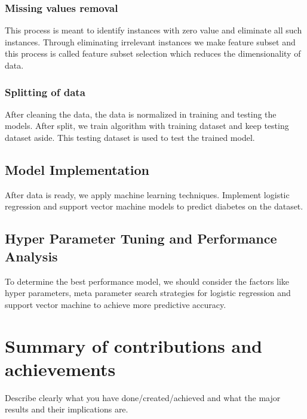 \subsubsection{Missing values removal}
\label{sec:intro_some_subsub1}
This process is meant to identify instances with zero value and eliminate all such instances. Through eliminating irrelevant instances we make feature subset and this process is called feature subset selection which reduces the dimensionality of data.

\subsubsection{Splitting of data}
\label{sec:intro_some_subsub2}
After cleaning the data, the data is normalized in training and testing the models. After split, we train algorithm with training dataset and keep testing dataset aside. This testing dataset is used to test the trained model.

\subsection{Model Implementation}
\label{sec:intro_some_sub3}
After data is ready, we apply machine learning techniques. Implement logistic regression and support vector machine models to predict diabetes on the dataset.

\subsection{Hyper Parameter Tuning and Performance Analysis}
\label{sec:intro_some_sub4}
To determine the best performance model, we should consider the factors like hyper parameters, meta parameter search strategies for logistic regression and support vector machine to achieve more predictive accuracy.

\section{Summary of contributions and achievements} %
\label{sec:intro_sum_results} %
Describe clearly what you have done/created/achieved and what the major results and their implications are. 
